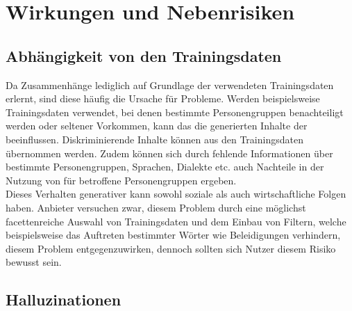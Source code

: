 \documentclass[../main.tex]{subfiles}
\begin{document}
\section{Wirkungen und Nebenrisiken}

\subsection{Abhängigkeit von den Trainingsdaten}

Da  Zusammenhänge lediglich auf Grundlage der verwendeten Trainingsdaten erlernt, sind diese häufig die Ursache für Probleme. Werden beispielsweise Trainingsdaten verwendet, 
bei denen bestimmte Personengruppen benachteiligt werden oder seltener Vorkommen, kann das die generierten Inhalte der  beeinflussen. Diskriminierende Inhalte können aus den Trainingsdaten 
übernommen werden. Zudem können sich durch fehlende Informationen über bestimmte Personengruppen, Sprachen, Dialekte etc. auch Nachteile in der Nutzung von  für betroffene 
Personengruppen ergeben.\\ Dieses Verhalten generativer  kann sowohl soziale als auch wirtschaftliche Folgen haben.  Anbieter versuchen zwar, diesem Problem durch eine möglichst 
facettenreiche Auswahl von Trainingsdaten und dem Einbau von Filtern, welche beispielsweise das Auftreten bestimmter Wörter wie Beleidigungen verhindern, diesem Problem entgegenzuwirken, 
dennoch sollten sich Nutzer diesem Risiko bewusst sein.\\

\subsection{Halluzinationen}
\end{document}
